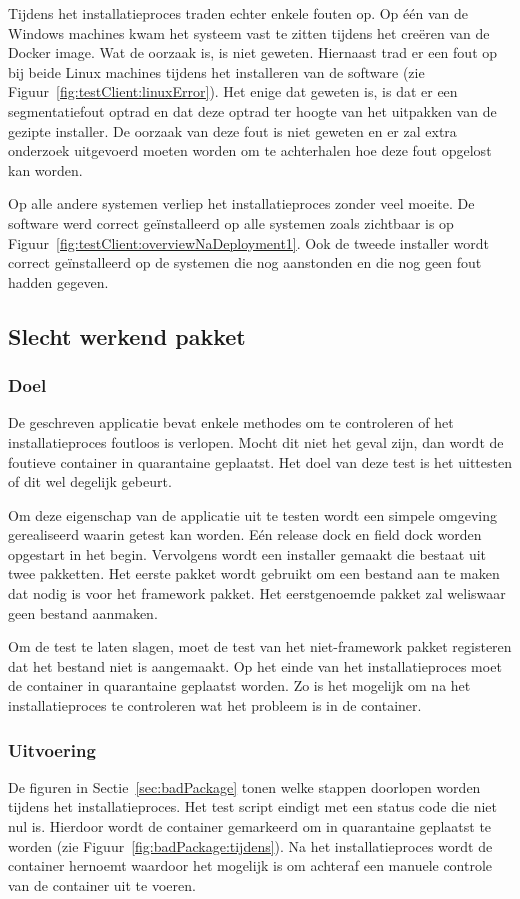 Tijdens het installatieproces traden echter enkele fouten op.
Op één van de Windows machines kwam het systeem vast te zitten tijdens het creëren van de Docker image.
Wat de oorzaak is, is niet geweten.
Hiernaast trad er een fout op bij beide Linux machines tijdens het installeren van de software (zie Figuur~\ref{fig:testClient:linuxError}).
Het enige dat geweten is, is dat er een segmentatiefout optrad en dat deze optrad ter hoogte van het uitpakken van de gezipte installer.
De oorzaak van deze fout is niet geweten en er zal extra onderzoek uitgevoerd moeten worden om te achterhalen hoe deze fout opgelost kan worden.

Op alle andere systemen verliep het installatieproces zonder veel moeite.
De software werd correct geïnstalleerd op alle systemen zoals zichtbaar is op Figuur~\ref{fig:testClient:overviewNaDeployment1}.
Ook de tweede installer wordt correct geïnstalleerd op de systemen die nog aanstonden en die nog geen fout hadden gegeven.

\subsection{Slecht werkend pakket}
\subsubsection{Doel}
De geschreven applicatie bevat enkele methodes om te controleren of het installatieproces foutloos is verlopen.
Mocht dit niet het geval zijn, dan wordt de foutieve container in quarantaine geplaatst.
Het doel van deze test is het uittesten of dit wel degelijk gebeurt.

Om deze eigenschap van de applicatie uit te testen wordt een simpele omgeving gerealiseerd waarin getest kan worden.
Eén release dock en field dock worden opgestart in het begin.
Vervolgens wordt een installer gemaakt die bestaat uit twee pakketten.
Het eerste pakket wordt gebruikt om een bestand aan te maken dat nodig is voor het framework pakket.
Het eerstgenoemde pakket zal weliswaar geen bestand aanmaken.

Om de test te laten slagen, moet de test van het niet-framework pakket registeren dat het bestand niet is aangemaakt.
Op het einde van het installatieproces moet de container in quarantaine geplaatst worden.
Zo is het mogelijk om na het installatieproces te controleren wat het probleem is in de container.

\subsubsection{Uitvoering}
De figuren in Sectie~\ref{sec:badPackage} tonen welke stappen doorlopen worden tijdens het installatieproces.
Het test script eindigt met een status code die niet nul is.
Hierdoor wordt de container gemarkeerd om in quarantaine geplaatst te worden (zie Figuur~\ref{fig:badPackage:tijdens}).
Na het installatieproces wordt de container hernoemt waardoor het mogelijk is om achteraf een manuele controle van de container uit te voeren.

